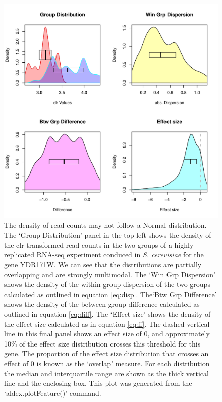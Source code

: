 \documentclass[fleqn,10pt,lineno]{wlpeerj}
\begin{document}
\begin{figure}[t!]
\centerline{\includegraphics[scale=0.50]{YDR171W_dist.pdf}}
\caption{The density of read counts may not follow a Normal  distribution. The `Group Distribution' panel in the top left shows the density of the clr-transformed read counts in the two groups of a highly replicated RNA-seq experiment conduced in \emph{S. cerevisiae} \citep{Schurch:2016aa} for the gene YDR171W. We can see that the distributions are partially overlapping and are strongly multimodal. The `Win Grp Dispersion' shows the density of the within group dispersion of the two groups calculated as outlined in equation  \ref{eq:disp}. The`Btw Grp Difference' shows the density of the between group difference calculated as outlined in  equation \ref{eq:diff}. The `Effect size' shows the density of the effect size calculated as in equation  \ref{eq:ff}. The dashed vertical line in this final panel shows an effect size of 0, and approximately 10\% of the effect size distribution crosses this threshold for this gene. The proportion of the effect size distribution that crosses an effect of 0 is known as the `overlap' measure. For each distribution the median and interquartile range are shown as the thick vertical line and the enclosing box. This plot was generated from the `aldex.plotFeature()' command.}
\label{fig:dist}
\end{figure}
	
\end{document}

